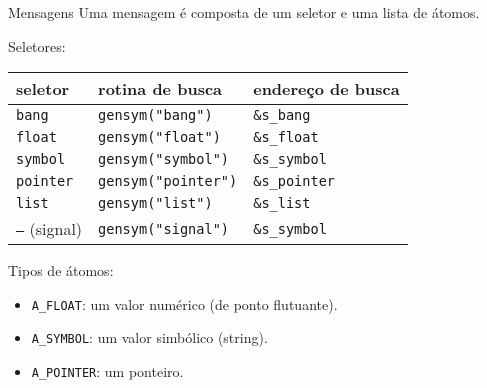 \begin{frame}{Mensagens}
Uma mensagem é composta de um seletor e uma lista de átomos.

\vspace{1em}
Seletores:

\begin{center}
\begin{tabular}{|l|l|l|}
\hline
  seletor & rotina de busca & endereço de busca \\
\hline
  \texttt{bang} & \texttt{gensym("bang")} & \texttt{\&s\_bang} \\
  \texttt{float} & \texttt{gensym("float")} & \texttt{\&s\_float} \\
  \texttt{symbol} & \texttt{gensym("symbol")} & \texttt{\&s\_symbol} \\
  \texttt{pointer} & \texttt{gensym("pointer")} & \texttt{\&s\_pointer} \\
  \texttt{list} & \texttt{gensym("list")} & \texttt{\&s\_list} \\
  \texttt{--}  (signal) & \texttt{gensym("signal")} & \texttt{\&s\_symbol} \\
\hline
\end{tabular}
\end{center}

Tipos de átomos:
\begin{itemize}
\item \texttt{A\_FLOAT}: um valor numérico (de ponto flutuante).
\item \texttt{A\_SYMBOL}: um valor simbólico (string).
\item \texttt{A\_POINTER}: um ponteiro.
\end{itemize}

\end{frame}


